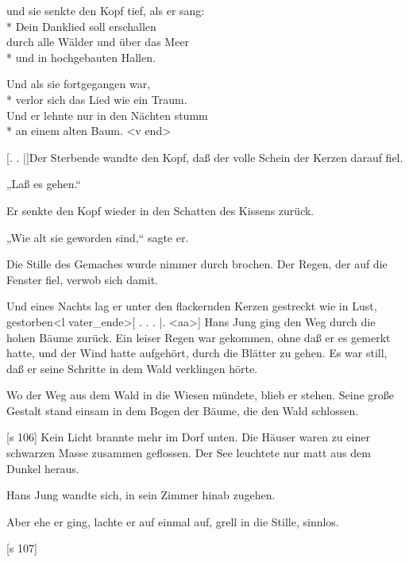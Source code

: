 und sie senkte den Kopf tief, als er sang:\\*
Dein Danklied soll erschallen\\
[s 105]
durch alle Wälder und über das Meer\\*
und in hochgebauten Hallen.

Und als sie fortgegangen war,\\*
verlor sich das Lied wie ein Traum.\\
Und er lehnte nur in den Nächten stumm\\*
an einem alten Baum.
<v end>

[. . |]Der Sterbende wandte den Kopf, daß der
volle Schein der Kerzen darauf fiel.

„Laß es gehen.“

Er senkte den Kopf wieder in den Schatten des
Kissens zurück.

„Wie alt sie geworden sind,“ sagte er.

Die Stille des Gemaches wurde nimmer durch­
brochen. Der Regen, der auf die Fenster fiel, verwob
sich damit.

Und eines Nachts lag er unter den flackernden
Kerzen gestreckt wie in Lust, gestorben<l vater_ende>[ . . .
|.
<aa>]
Hans Jung ging den Weg durch die hohen Bäume
zurück. Ein leiser Regen war gekommen, ohne daß
er es gemerkt hatte, und der Wind hatte aufgehört,
durch die Blätter zu gehen. Es war still, daß er
seine Schritte in dem Wald verklingen hörte.

Wo der Weg aus dem Wald in die Wiesen
mündete, blieb er stehen. Seine große Gestalt stand
einsam in dem Bogen der Bäume, die den Wald schlossen.

[s 106]
Kein Licht brannte mehr im Dorf unten. Die
Häuser waren zu einer schwarzen Masse zusammen­
geflossen. Der See leuchtete nur matt aus dem Dunkel
heraus.

Hans Jung wandte sich, in sein Zimmer hinab­
zugehen.

Aber ehe er ging, lachte er auf einmal auf, grell
in die Stille, sinnlos.

[s 107]

